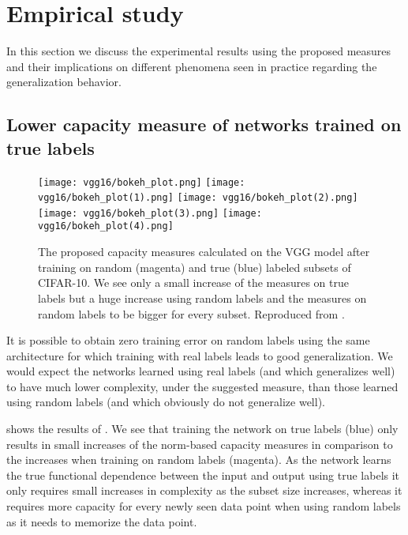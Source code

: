 \section{Empirical study}
\label{sec:empricial-study}
In this section we discuss the experimental results using the proposed measures and their implications on different phenomena seen in practice regarding the generalization behavior.
%
\subsection{Lower capacity measure of networks trained on true labels}
\begin{figure}[ht]
	\centering
	\texttt{[image: vgg16/bokeh\_plot.png]}
	\texttt{[image: vgg16/bokeh\_plot(1).png]}
	\texttt{[image: vgg16/bokeh\_plot(2).png]}\\
	\texttt{[image: vgg16/bokeh\_plot(3).png]}
	\texttt{[image: vgg16/bokeh\_plot(4).png]}
	\caption{The proposed capacity measures calculated on the VGG model \cite{simonyan2014deep} after training on random (magenta) and true (blue) labeled subsets of CIFAR-10. We see only a small increase of the measures on true labels but a huge increase using random labels and the measures on random labels to be bigger for every subset. Reproduced from \cite{neyshabur2017exploring}.}	
	\label{fig:norms-paper}
\end{figure}
It is possible to obtain zero training error on random labels using the same architecture for which training with real labels leads to good generalization. We would expect the networks learned using real labels (and which generalizes well) to have much lower complexity, under the suggested measure, than those learned using random labels (and which obviously do not generalize well). \cite{neyshabur2017exploring} \par
%
 shows the results of \cite{neyshabur2017exploring}. We see that training the network on true labels (blue) only results in small increases of the norm-based capacity measures in comparison to the increases when training on random labels (magenta). As the network learns the true functional dependence between the input and output using true labels it only requires small increases in complexity as the subset size increases, whereas it requires more capacity for every newly seen data point when using random labels as it needs to memorize the data point.\\
